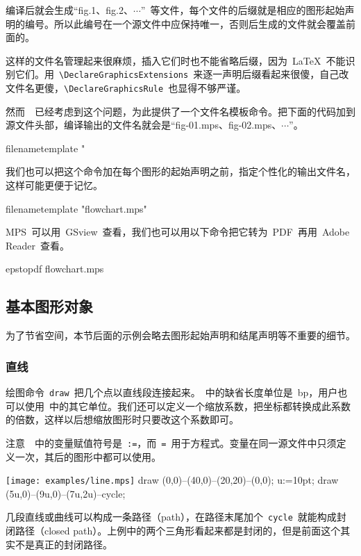 编译后就会生成“fig.1、fig.2、$\cdots$”~等文件，每个文件的后缀就是相应的图形起始声明的编号。所以此编号在一个源文件中应保持唯一，否则后生成的文件就会覆盖前面的。

这样的文件名管理起来很麻烦，插入它们时也不能省略后缀，因为~\LaTeX~不能识别它们。用~\verb|\DeclareGraphicsExtensions|~来逐一声明后缀看起来很傻，自己改文件名更傻，\verb|\DeclareGraphicsRule|~也显得不够严谨。

然而~\MP~已经考虑到这个问题，为此提供了一个文件名模板命令。把下面的代码加到源文件头部，编译输出的文件名就会是“fig-01.mps、fig-02.mps、$\cdots$”。
\begin{code}
filenametemplate "%
\end{code}

我们也可以把这个命令加在每个图形的起始声明之前，指定个性化的输出文件名，这样可能更便于记忆。
\begin{code}
filenametemplate "flowchart.mps" %
\end{code}

MPS~可以用~GSview~查看，我们也可以用以下命令把它转为~PDF~再用~Adobe Reader~查看。

\begin{code}
epstopdf flowchart.mps
\end{code}

\subsection{基本图形对象}
为了节省空间，本节后面的示例会略去图形起始声明和结尾声明等不重要的细节。

\subsubsection{直线}

绘图命令~\verb|draw|~把几个点以直线段连接起来。\MP~中的缺省长度单位是~bp，用户也可以使用~中的其它单位。我们还可以定义一个缩放系数，把坐标都转换成此系数的倍数，这样以后想缩放图形时只要改这个系数即可。

注意~\MP~中的变量赋值符号是~\verb|:=|，而~\verb|=|~用于方程式。变量在同一源文件中只须定义一次，其后的图形中都可以使用。

\begin{fdemo}{\texttt{[image: examples/line.mps]}}
draw (0,0)--(40,0)--(20,20)--(0,0);
u:=10pt; %
draw (5u,0)--(9u,0)--(7u,2u)--cycle;
\end{fdemo}

几段直线或曲线可以构成一条路径（path），在路径末尾加个~\verb|cycle|~就能构成封闭路径（closed path）。上例中的两个三角形看起来都是封闭的，但是前面这个其实不是真正的封闭路径。

